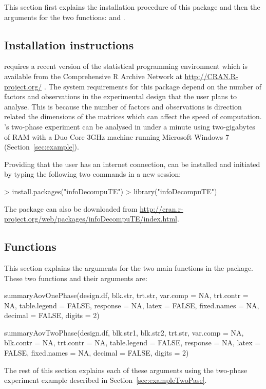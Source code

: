 \documentclass[article]{jss}
\begin{document}
This section first explains the installation procedure of this package and then the arguments for the two functions:  and .

\subsection{Installation instructions}
 requires a recent version of the  statistical programming environment which is available from the Comprehensive R Archive Network at \url{http://CRAN.R-project.org/} \citep{R2012}. The system requirements for this package depend on the number of factors and observations in the experimental design that the user plans to analyse. This is because the number of factors and observations is direction related the dimensions of the matrices which can affect the speed of computation. \citeauthor{Brien1999}'s \citeyearpar{Brien1999} two-phase experiment can be analysed in under a minute using two-gigabytes of RAM with a Duo Core 3GHz machine running Microsoft Windows 7 (Section~\ref{sec:example}).

Providing that the user has an internet connection,  can be installed and initiated by typing the following two commands in a new  session: 
\begin{CodeChunk}
\begin{CodeInput}
> install.packages("infoDecompuTE")
> library("infoDecompuTE")
\end{CodeInput}
\end{CodeChunk}
The package can also be downloaded from \url{http://cran.r-project.org/web/packages/infoDecompuTE/index.html}.


\subsection{Functions}
This section explains the arguments for the two main functions in the  package. These two functions and their arguments are:
\begin{CodeChunk}
\begin{CodeInput}
summaryAovOnePhase(design.df, blk.str, trt.str, var.comp = NA,
                trt.contr = NA, table.legend = FALSE, response = NA, 
                latex = FALSE, fixed.names = NA, decimal = FALSE, 
                digits = 2)
                
summaryAovTwoPhase(design.df, blk.str1, blk.str2, trt.str, var.comp = NA, 
                blk.contr = NA, trt.contr = NA, table.legend = FALSE,
                response = NA, latex = FALSE, fixed.names = NA,
                decimal = FALSE, digits = 2)
                
\end{CodeInput}
\end{CodeChunk}
The rest of this section explains each of these arguments using the two-phase experiment example described in Section~\ref{sec:exampleTwoPase}.
\end{document}

